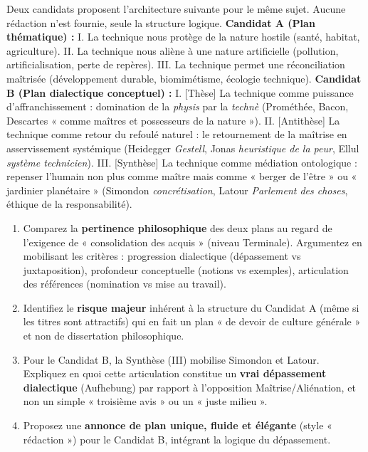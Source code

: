 \documentclass[11pt]{article}
\begin{document}
\begin{exercice}
Deux candidats proposent l'architecture suivante pour le même sujet. Aucune rédaction n'est fournie, seule la structure logique.
\textbf{Candidat A (Plan thématique) :}
I. La technique nous protège de la nature hostile (santé, habitat, agriculture).
II. La technique nous aliène à une nature artificielle (pollution, artificialisation, perte de repères).
III. La technique permet une réconciliation maîtrisée (développement durable, biomimétisme, écologie technique).
\textbf{Candidat B (Plan dialectique conceptuel) :}
I. [Thèse] La technique comme puissance d'affranchissement : domination de la \textit{physis} par la \textit{technè} (Prométhée, Bacon, Descartes « comme maîtres et possesseurs de la nature »).
II. [Antithèse] La technique comme retour du refoulé naturel : le retournement de la maîtrise en asservissement systémique (Heidegger \textit{Gestell}, Jonas \textit{heuristique de la peur}, Ellul \textit{système technicien}).
III. [Synthèse] La technique comme médiation ontologique : repenser l'humain non plus comme maître mais comme « berger de l'être » ou « jardinier planétaire » (Simondon \textit{concrétisation}, Latour \textit{Parlement des choses}, éthique de la responsabilité).
\begin{enumerate}
    \item Comparez la \textbf{pertinence philosophique} des deux plans au regard de l'exigence de « consolidation des acquis » (niveau Terminale). Argumentez en mobilisant les critères : progression dialectique (dépassement vs juxtaposition), profondeur conceptuelle (notions vs exemples), articulation des références (nomination vs mise au travail).
    \item Identifiez le \textbf{risque majeur} inhérent à la structure du Candidat A (même si les titres sont attractifs) qui en fait un plan « de devoir de culture générale » et non de dissertation philosophique.
    \item Pour le Candidat B, la Synthèse (III) mobilise Simondon et Latour. Expliquez en quoi cette articulation constitue un \textbf{vrai dépassement dialectique} (Aufhebung) par rapport à l'opposition Maîtrise/Aliénation, et non un simple « troisième avis » ou un « juste milieu ».
    \item Proposez une \textbf{annonce de plan unique, fluide et élégante} (style « rédaction ») pour le Candidat B, intégrant la logique du dépassement.
\end{enumerate}
\end{exercice}
\end{document}
